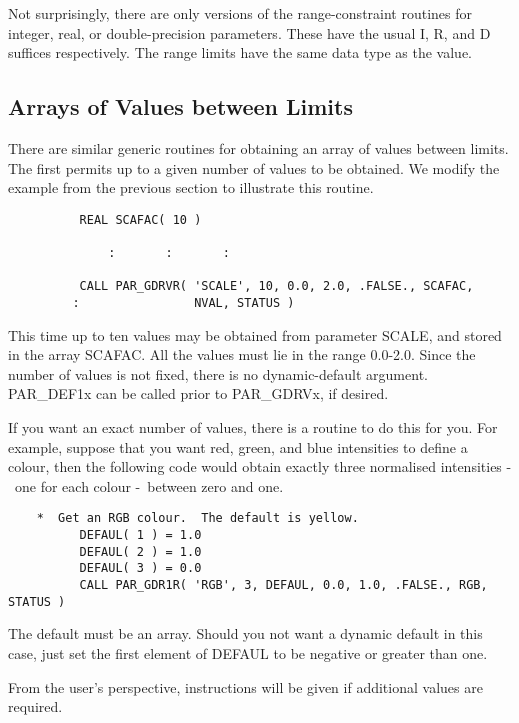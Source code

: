 \documentclass[twoside,11pt]{article}
\newcommand{\xlabel}[1]{}
\newcommand{\dash}{--}
\renewcommand{\dash}{-}
\begin{document}
Not surprisingly, there are only versions of the range-constraint
routines for integer, real, or double-precision parameters.   These have
the usual I, R, and D suffices respectively.  The range limits have the
same data type as the value.

\subsection{\xlabel{arrays_of_values_between_limits}Arrays of Values between Limits}
\label{se:avl}

There are similar generic routines for obtaining an array of values
between limits.  The first permits up to a given number of values to be
obtained.  We modify the example from the previous section to illustrate
this routine. 

\begin{verbatim}
          REAL SCAFAC( 10 )
 
              :       :       :

          CALL PAR_GDRVR( 'SCALE', 10, 0.0, 2.0, .FALSE., SCAFAC,
         :                NVAL, STATUS )
\end{verbatim}

This time up to ten values may be obtained from parameter SCALE, and
stored in the array SCAFAC.  All the values must lie in the range
0.0\dash2.0.  Since the number of values is not fixed, there is no
dynamic-default argument.  PAR\_DEF1x can be called prior to PAR\_GDRVx,
if desired. 

If you want an exact number of values, there is a routine to do this
for you.  For example, suppose that you want red, green, and blue
intensities to define a colour, then the following code would obtain
exactly three normalised intensities \dash\ one for each colour \dash\ between
zero and one.

\begin{verbatim}
    *  Get an RGB colour.  The default is yellow.
          DEFAUL( 1 ) = 1.0
          DEFAUL( 2 ) = 1.0
          DEFAUL( 3 ) = 0.0
          CALL PAR_GDR1R( 'RGB', 3, DEFAUL, 0.0, 1.0, .FALSE., RGB, STATUS )
\end{verbatim}

The default must be an array.  Should you not want a dynamic default in
this case, just set the first element of DEFAUL to be negative or
greater than one. 

From the user's perspective, instructions will be given if additional
values are required.
\end{document}
